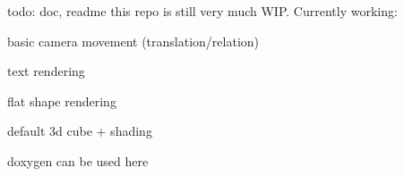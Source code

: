 todo\+: doc, readme this repo is still very much WIP. Currently working\+:
\begin{DoxyItemize}
\item basic camera movement (translation/relation)
\item text rendering
\item flat shape rendering
\item default 3d cube + shading
\end{DoxyItemize}

doxygen can be used here 